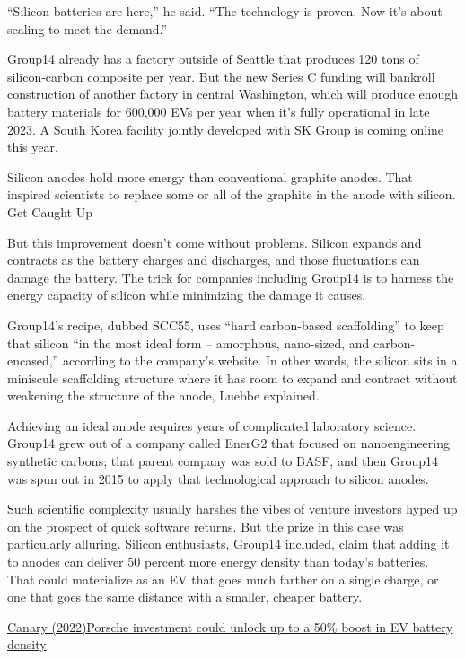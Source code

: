 \documentclass[
]{book}
\begin{document}
``Silicon batteries are here,'' he said. \hspace{0pt}``The technology is proven. Now it's about scaling to meet the demand.''

Group14 already has a factory outside of Seattle that produces 120 tons of silicon-carbon composite per year. But the new Series C funding will bankroll construction of another factory in central Washington, which will produce enough battery materials for 600,000 EVs per year when it's fully operational in late 2023. A South Korea facility jointly developed with SK Group is coming online this year.

Silicon anodes hold more energy than conventional graphite anodes. That inspired scientists to replace some or all of the graphite in the anode with silicon.
Get Caught Up

But this improvement doesn't come without problems. Silicon expands and contracts as the battery charges and discharges, and those fluctuations can damage the battery. The trick for companies including Group14 is to harness the energy capacity of silicon while minimizing the damage it causes.

Group14's recipe, dubbed SCC55, uses \hspace{0pt}``hard carbon-based scaffolding'' to keep that silicon \hspace{0pt}``in the most ideal form -- amorphous, nano-sized, and carbon-encased,'' according to the company's website. In other words, the silicon sits in a miniscule scaffolding structure where it has room to expand and contract without weakening the structure of the anode, Luebbe explained.

Achieving an ideal anode requires years of complicated laboratory science. Group14 grew out of a company called EnerG2 that focused on nanoengineering synthetic carbons; that parent company was sold to BASF, and then Group14 was spun out in 2015 to apply that technological approach to silicon anodes.

Such scientific complexity usually harshes the vibes of venture investors hyped up on the prospect of quick software returns. But the prize in this case was particularly alluring. Silicon enthusiasts, Group14 included, claim that adding it to anodes can deliver 50 percent more energy density than today's batteries. That could materialize as an EV that goes much farther on a single charge, or one that goes the same distance with a smaller, cheaper battery.

\href{https://www.canarymedia.com/articles/electric-vehicles/porsche-investment-could-unlock-a-25-boost-in-ev-battery-density}{Canary (2022)Porsche investment could unlock up to a 50\% boost in EV battery density}
\end{document}
